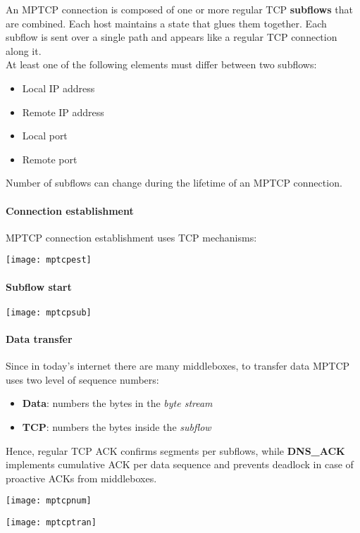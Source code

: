 An MPTCP connection is composed of one or more regular TCP \textbf{subflows} that are combined. Each host maintains a state that glues them together. Each subflow is sent over a single path and appears like a regular TCP connection along it.\\
At least one of the following elements must differ between two subflows:
\begin{itemize}
	\item Local IP address
	\item Remote IP address
	\item Local port
	\item Remote port
\end{itemize}
\newpage
\begin{note}
	Number of subflows can change during the lifetime of an MPTCP connection.
\end{note}

\paragraph{Connection establishment} MPTCP connection establishment uses TCP mechanisms:
\begin{center}
	\texttt{[image: mptcpest]}
\end{center}
\paragraph{Subflow start}
\begin{center}
	\texttt{[image: mptcpsub]}
\end{center}
\paragraph{Data transfer} Since in today's internet there are many middleboxes, to transfer data MPTCP uses two level of sequence numbers:
\begin{itemize}
	\item \textbf{Data}: numbers the bytes in the \textit{byte stream}
	\item \textbf{TCP}: numbers the bytes inside the \textit{subflow}
\end{itemize}
Hence, regular TCP ACK confirms segments per subflows, while \textbf{DNS\_ACK} implements cumulative ACK per data sequence and prevents deadlock in case of proactive ACKs from middleboxes.
\begin{center}
	\texttt{[image: mptcpnum]}
\end{center}
\begin{center}
	\texttt{[image: mptcptran]}
\end{center}

